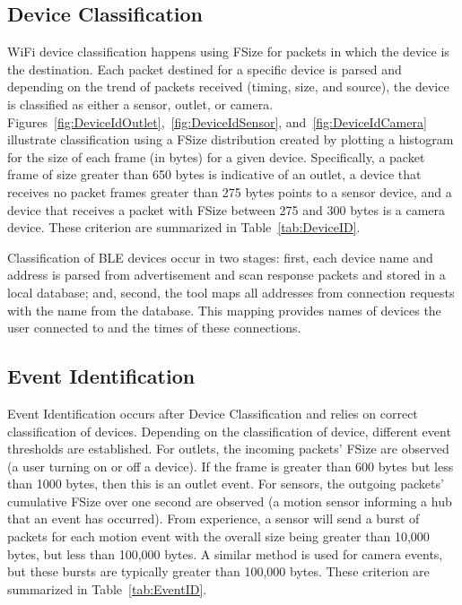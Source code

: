 \subsection{Device Classification}

WiFi device classification happens using \ac{FSize} for packets in which the device is the destination. Each packet destined for a specific device is parsed and depending on the trend of packets received (timing, size, and source), the device is classified as either a sensor, outlet, or camera. Figures~\ref{fig:DeviceIdOutlet},~\ref{fig:DeviceIdSensor}, and~\ref{fig:DeviceIdCamera} illustrate classification using a \ac{FSize} distribution created by plotting a histogram for the size of each frame (in bytes) for a given device. Specifically, a packet frame of size greater than 650 bytes is indicative of an outlet, a device that receives no packet frames greater than 275 bytes points to a sensor device, and a device that receives a packet with \ac{FSize} between  275 and 300 bytes is a camera device. These criterion are summarized in Table~\ref{tab:DeviceID}.

\figDeviceId


Classification of \ac{BLE} devices occur in two stages: first, each device name and address is parsed from advertisement and scan response packets and stored in a local database; and, second, the tool maps all addresses from connection requests with the name from the database. This mapping provides names of devices the user connected to and the times of these connections.

\subsection{Event Identification}

Event Identification occurs after Device Classification and relies on correct classification of devices. Depending on the classification of device, different event thresholds are established. For outlets, the incoming packets' \ac{FSize} are observed (a user turning on or off a device). If the frame is greater than 600 bytes but less than 1000 bytes, then this is an outlet event. For sensors, the outgoing packets' cumulative \ac{FSize} over one second are observed (a motion sensor informing a hub that an event has occurred). From experience, a sensor will send a burst of packets for each motion event with the overall size being greater than 10,000 bytes, but less than 100,000 bytes. A similar method is used for camera events, but these bursts are typically greater than 100,000 bytes. These criterion are summarized in Table~\ref{tab:EventID}.

